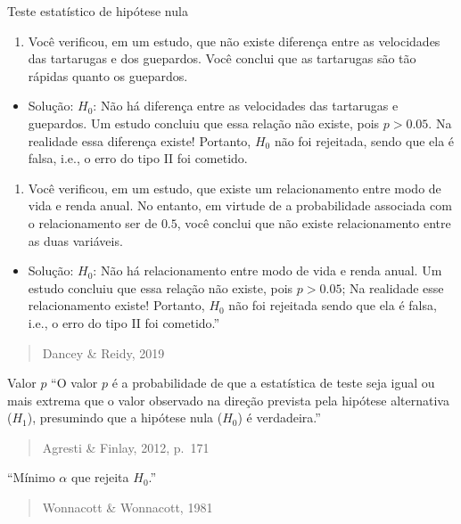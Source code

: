 \documentclass[
  ignorenonframetext,
]{beamer}
\providecommand{\tightlist}{%
  \setlength{\itemsep}{0pt}\setlength{\parskip}{0pt}}
\begin{document}
\begin{frame}{Teste estatístico de hipótese nula}
\begin{enumerate}
\tightlist
\item
  Você verificou, em um estudo, que não existe diferença entre as
  velocidades das tartarugas e dos guepardos. Você conclui que as
  tartarugas são tão rápidas quanto os guepardos.
\end{enumerate}

\begin{itemize}
\tightlist
\item
  Solução: \(H_{0}\): Não há diferença entre as velocidades das
  tartarugas e guepardos. Um estudo concluiu que essa relação não
  existe, pois \(p>0.05\). Na realidade essa diferença existe! Portanto,
  \(H_{0}\) não foi rejeitada, sendo que ela é falsa, i.e., o erro do
  tipo II foi cometido.
\end{itemize}

\begin{enumerate}
\tightlist
\item
  Você verificou, em um estudo, que existe um relacionamento entre modo
  de vida e renda anual. No entanto, em virtude de a probabilidade
  associada com o relacionamento ser de \(0.5\), você conclui que não
  existe relacionamento entre as duas variáveis.
\end{enumerate}

\begin{itemize}
\tightlist
\item
  Solução: \(H_{0}\): Não há relacionamento entre modo de vida e renda
  anual. Um estudo concluiu que essa relação não existe, pois
  \(p>0.05\); Na realidade esse relacionamento existe! Portanto,
  \(H_{0}\) não foi rejeitada sendo que ela é falsa, i.e., o erro do
  tipo II foi cometido.''
\end{itemize}

\begin{quote}
Dancey \& Reidy, 2019
\end{quote}
\end{frame}

\begin{frame}{Valor \(p\)}
\protect\hypertarget{valor-p}{}
``O valor \(p\) é a probabilidade de que a estatística de teste seja
igual ou mais extrema que o valor observado na direção prevista pela
hipótese alternativa (\(H_{1}\)), presumindo que a hipótese nula
(\(H_{0}\)) é verdadeira.''

\begin{quote}
Agresti \& Finlay, 2012, p.~171
\end{quote}

``Mínimo \(\alpha\) que rejeita \(H_{0}\).''

\begin{quote}
Wonnacott \& Wonnacott, 1981
\end{quote}
\end{frame}
\end{document}
